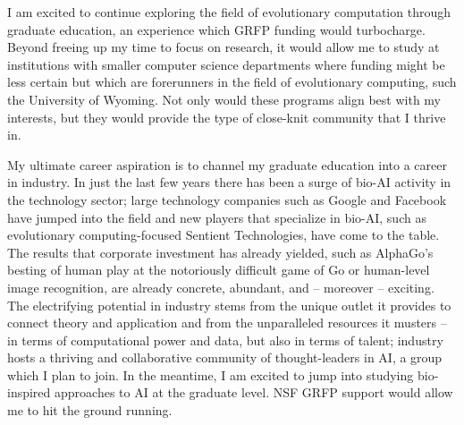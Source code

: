 \documentclass[12pt]{book}
\begin{document}

I am excited to continue exploring the field of evolutionary computation through graduate education, an experience which GRFP funding would turbocharge. Beyond freeing up my time to focus on research, it would allow me to study at institutions with smaller computer science departments where funding might be less certain but which are forerunners in the field of evolutionary computing, such the University of Wyoming. Not only would these programs align best with my interests, but they would provide the type of close-knit community that I thrive in. 

My ultimate career aspiration is to channel my graduate education into a career in industry. In just the last few years there has been a surge of bio-AI activity in the technology sector; large technology companies such as Google and Facebook have jumped into the field and new players that specialize in bio-AI, such as evolutionary computing-focused Sentient Technologies, have come to the table. The results that corporate investment has already yielded, such as AlphaGo's besting of human play at the notoriously difficult game of Go or human-level image recognition, are already concrete, abundant, and -- moreover -- exciting. The electrifying potential in industry stems from the unique outlet it provides to connect theory and application and from the unparalleled resources it musters -- in terms of computational power and data, but also in terms of talent; industry hosts a thriving and collaborative community of thought-leaders in AI, a group which I plan to join. In the meantime, I am excited to jump into studying bio-inspired approaches to AI at the graduate level. NSF GRFP support would allow me to hit the ground running.
\end{document}
